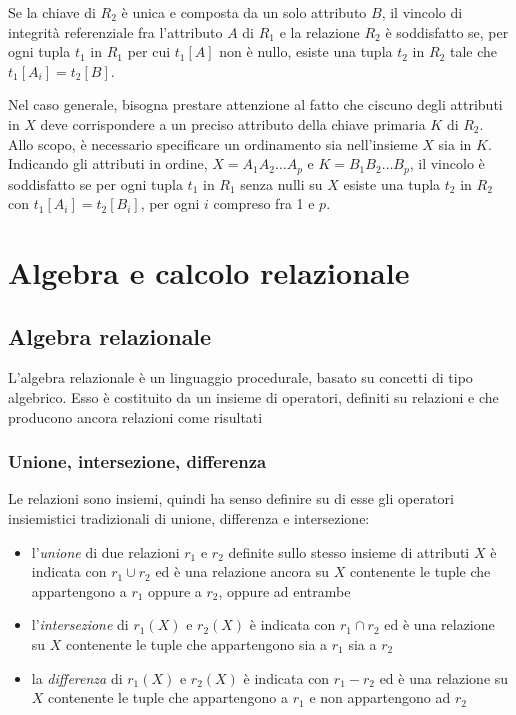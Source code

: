 \documentclass[11pt]{book}
\begin{document}
Se la chiave di $R_2$ è unica e composta da un solo attributo $B$, il vincolo di integrità referenziale fra l'attributo 
$A$ di $R_1$ e la relazione $R_2$ è soddisfatto se, per ogni tupla $t_1$ in $R_1$ per cui $t_1[A]$ non è nullo, esiste 
una tupla $t_2$ in $R_2$ tale che $t_1[A_i]=t_2[B]$.

Nel caso generale, bisogna prestare attenzione al fatto che ciscuno degli attributi in $X$ deve corrispondere a un preciso 
attributo della chiave primaria $K$ di $R_2$. Allo scopo, è necessario specificare un ordinamento sia nell'insieme $X$ sia 
in $K$. Indicando gli attributi in ordine, $X=A_1 A_2 \dots A_p$ e $K=B_1 B_2 \dots B_p$, il vincolo è soddisfatto se per 
ogni tupla $t_1$ in $R_1$ senza nulli su $X$ esiste una tupla $t_2$ in $R_2$ con $t_1[A_i]=t_2[B_i]$, per ogni $i$ compreso
fra 1 e $p$.
\chapter{Algebra e calcolo relazionale}
\section{Algebra relazionale}
L'algebra relazionale è un linguaggio procedurale, basato su concetti di tipo algebrico. Esso è costituito da un insieme 
di operatori, definiti su relazioni e che producono ancora relazioni come risultati
\subsection{Unione, intersezione, differenza}
Le relazioni sono insiemi, quindi ha senso definire su di esse gli operatori insiemistici tradizionali di unione, differenza 
e intersezione:
\begin{itemize}
    \item l'\textit{unione} di due relazioni $r_1$ e $r_2$ definite sullo stesso insieme di attributi $X$ è indicata con 
    $r_1\cup r_2$ ed è una relazione ancora su $X$ contenente le tuple che appartengono a $r_1$ oppure a $r_2$, oppure 
    ad entrambe 
    \item l'\textit{intersezione} di $r_1(X)$ e $r_2(X)$ è indicata con $r_1\cap r_2$ ed è una relazione su $X$ contenente 
    le tuple che appartengono sia a $r_1$ sia a $r_2$
    \item la \textit{differenza} di $r_1(X)$ e $r_2(X)$ è indicata con $r_1 - r_2$ ed è una relazione su $X$ contenente 
    le tuple che appartengono a $r_1$ e non appartengono ad $r_2$
\end{itemize}
\end{document}
